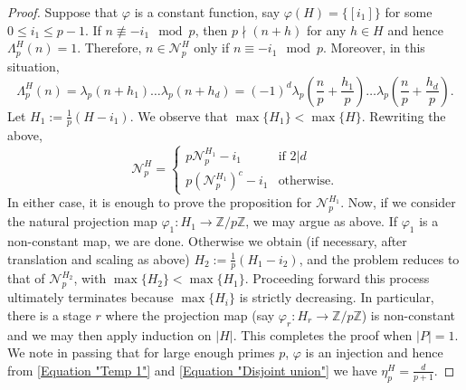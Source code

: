 \documentclass[12pt, a4paper]{amsart}
\theoremstyle{remark}
\theoremstyle{proof}
\numberwithin{equation}{section}
\numberwithin{assumption}{section}
\newcommand{\Z}{\mathbb{Z}}
\begin{document}
\begin{proof}
		Suppose that $\varphi$ is a constant function, say $\varphi(H) = \{[i_1]\}$ for some $0\leqslant i_1\leqslant p-1$. If $n\not\equiv -i_1\mod p$, then $p\nmid (n+h)$ for any $h\in H$ and hence $\Lambda_p^H(n)=1$. Therefore, $n\in \mathcal{N}_p^H$ only if $n\equiv -i_1\mod p$. Moreover, in this situation,
		\[
		\Lambda_p^H(n) = \lambda_p(n+h_1)\ldots\lambda_p(n+h_d) = (-1)^d \lambda_p\left(\frac{n}{p} + \frac{h_1}{p}\right)\ldots \lambda_p\left(\frac{n}{p} + \frac{h_d}{p}\right).
		\]
		Let $H_1:=\frac{1}{p}(H-i_1)$. We observe that $\max\{H_1\} < \max\{H\}$. Rewriting the above,
		\begin{equation}\label{Equation "Calculation"}
			\mathcal{N}_p^H = \begin{cases}
				p \mathcal{N}_p^{H_1} - i_1&\mbox{if }2| d\\
				p \left(\mathcal{N}_p^{H_1}\right)^c - i_1&\mbox{otherwise.}
			\end{cases}
		\end{equation}
		In either case, it is enough to prove the proposition for $\mathcal{N}_p^{H_1}$. Now, if we consider the natural projection map $\varphi_1: H_1\to \Z/p\Z$, we may argue as above. If $\varphi_1$ is a non-constant map, we are done. Otherwise we obtain (if necessary, after translation and scaling as above) $H_2:= \frac{1}{p} (H_1-i_2)$, and the problem reduces to that of $\mathcal{N}_p^{H_2}$, with $\max\{H_2\} < \max\{H_1\}$. Proceeding forward this process ultimately terminates because $\max\{H_i\}$ is strictly decreasing. In particular, there is a stage $r$ where the projection map (say $\varphi_r : H_r\to \Z/p\Z$) is non-constant and we may then apply induction on $|H|$. This completes the proof when $|P|=1$. We note in passing that for large enough primes $p$, $\varphi$ is an injection and hence from \eqref{Equation "Temp 1"} and \eqref{Equation "Disjoint union"} we have $\eta_p^H = \frac{d}{p+1}.$
		

\end{proof}
\end{document}
